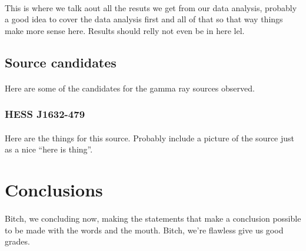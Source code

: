 \documentclass[a4paper, titlepage, oneside]{article}
\begin{document}
\begin{multicols}{2}
\paragraph{}
This is where we talk aout all the resuts we get from our data analysis, probably a good idea to cover the data analysis first and all of that so that way things make more sense here. Results should relly not even be in here lel.

\subsection{Source candidates}
\paragraph{}
Here are some of the candidates for the gamma ray sources observed.

\subsubsection{HESS J1632-479}
\paragraph{}
Here are the things for this source. Probably include a picture of the source just as a nice ``here is thing''.

\section{Conclusions}
\paragraph{}
Bitch, we concluding now, making the statements that make a conclusion possible to be made with the words and the mouth. Bitch, we're flawless give us good grades.
\end{multicols}

\printbibliography[heading = bibintoc] %
\end{document}
